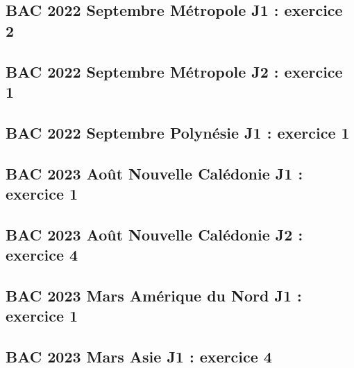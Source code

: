 \documentclass[lang=fr,edition=teacher,layout=sheet]{mxbook}
\begin{document}
\begingroup\endgroup
\par\bigskip
{}\subsection*{BAC 2022 Septembre Métropole J1 : exercice 2}
\begingroup\endgroup
\par\bigskip
{}\subsection*{BAC 2022 Septembre Métropole J2 : exercice 1}
\begingroup\endgroup
\par\bigskip
{}\subsection*{BAC 2022 Septembre Polynésie J1 : exercice 1}
\begingroup\endgroup
\par\bigskip
{}\subsection*{BAC 2023 Août Nouvelle Calédonie J1 : exercice 1}
\begingroup\endgroup
\par\bigskip
{}\subsection*{BAC 2023 Août Nouvelle Calédonie J2 : exercice 4}
\begingroup\endgroup
\par\bigskip
{}\subsection*{BAC 2023 Mars Amérique du Nord J1 : exercice 1}
\begingroup\endgroup
\par\bigskip
{}\subsection*{BAC 2023 Mars Asie J1 : exercice 4}
\end{document}
